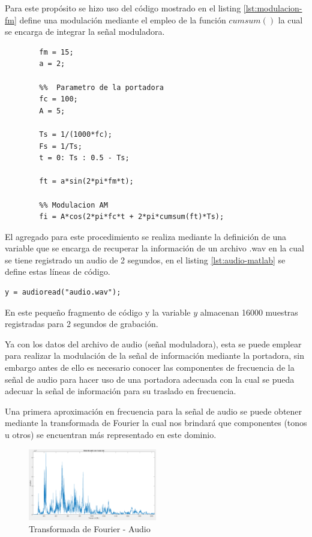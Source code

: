 \documentclass[conference]{IEEEtran}
\begin{document}
	Para este propósito se hizo uso del código mostrado en el listing \ref{lst:modulacion-fm} define una modulación mediante el empleo de la función $cumsum()$ la cual se encarga de integrar la señal moduladora.
	
	\begin{lstlisting}[numbers=none, caption="Modulacion FM de una señal de Audio", label=lst:modulacion-fm]
		%% Parametros de la senal de informacion
		fm = 15;
		a = 2;
		
		%%  Parametro de la portadora
		fc = 100;
		A = 5;
		
		Ts = 1/(1000*fc);
		Fs = 1/Ts;
		t = 0: Ts : 0.5 - Ts;
		
		ft = a*sin(2*pi*fm*t);
		
		%% Modulacion AM
		fi = A*cos(2*pi*fc*t + 2*pi*cumsum(ft)*Ts);
	\end{lstlisting}
	
	El agregado para este procedimiento se realiza mediante la definición de una variable que se encarga de recuperar la información de un archivo .wav en la cual se tiene registrado un audio de 2 segundos, en el listing \ref{lst:audio-matlab} se define estas líneas de código.
	
	\begin{lstlisting}[caption={Lectura del archivo del audio}, numbers=none, label=lst:audio-matlab]
		y = audioread("audio.wav");
	\end{lstlisting}
	
	En este pequeño fragmento de código y la variable $y$ almacenan 16000 muestras registradas para 2 segundos de grabación.
	
	Ya con los datos del archivo de audio (señal moduladora), esta se puede emplear para realizar la modulación de la señal de información mediante la portadora, sin embargo antes de ello es necesario conocer las componentes de frecuencia de la señal de audio para hacer uso de una portadora adecuada con la cual se pueda adecuar la señal de información para su traslado en frecuencia.
	
	Una primera aproximación en frecuencia para la señal de audio se puede obtener mediante la transformada de Fourier la cual nos brindará que componentes (tonos u otros) se encuentran más representado en este dominio.
	
	\begin{figure}[h]
		\centering
		\includegraphics[width=0.5\textwidth]{media/fft-audio}
		\caption{Transformada de Fourier - Audio}
		\label{fig:fft-audio}
	\end{figure}
	
\end{document}
